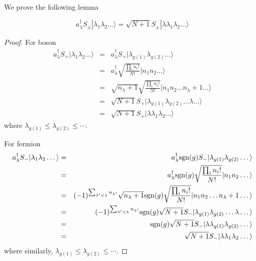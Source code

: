 \documentclass[12pt]{book}
\begin{document}
	We prove the following lemma
	\begin{lemma}\label{lem:aS}
		\begin{equation}
			a_\lambda^\dagger S_\pm|\lambda_1\lambda_2\dots\rangle=\sqrt{N+1}S_\pm|\lambda\lambda_1\lambda_2\dots\rangle
		\end{equation}
	\end{lemma}
	\begin{proof}
		For boson
		\begin{eqnarray}
			a_\lambda^\dagger S_+|\lambda_1\lambda_2\dots\rangle&=&a_\lambda^\dagger S_+|\lambda_{g(1)}\lambda_{g(2)}\dots\rangle\\
			&=&a_\lambda^\dagger\sqrt{\frac{\prod_i n_i!}{N!}}|n_1n_2\dots\rangle\\
			&=&\sqrt{n_\lambda+1}\sqrt{\frac{\prod_i n_i!}{N!}}|n_1n_2\dots n_\lambda+1\dots\rangle\\
			&=&\sqrt{N+1}S_+|\lambda_{g(1)}\lambda_{g(2)}\dots\lambda\dots\rangle\\
			&=&\sqrt{N+1}S_+|\lambda\lambda_1\lambda_2\dots\rangle
		\end{eqnarray}
		where $\lambda_{g(1)}\leq\lambda_{g(2)}\leq\cdots$.
		
		For fermion
		\begin{eqnarray}
			a_\lambda^\dagger S_-|\lambda_1\lambda_2\dots\rangle&=&a_\lambda^\dagger{\rm sgn}(g)S_-|\lambda_{g(1)}\lambda_{g(2)}\dots\rangle\\
			&=&a_\lambda^\dagger{\rm sgn}(g)\sqrt{\frac{\prod_i n_i!}{N!}}|n_1n_2\dots\rangle\\
			&=&(-1)^{\sum_{\lambda'<\lambda}n_{\lambda'}}\sqrt{n_\lambda+1}{\rm sgn}(g)\sqrt{\frac{\prod_i n_i!}{N!}}|n_1n_2\dots n_\lambda+1\dots\rangle\\
			&=&(-1)^{\sum_{\lambda'<\lambda}n_{\lambda'}}{\rm sgn}(g)\sqrt{N+1}S_-|\lambda_{g(1)}\lambda_{g(2)}\dots\lambda\dots\rangle\\
			&=&{\rm sgn}(g)\sqrt{N+1}S_-|\lambda\lambda_{g(1)}\lambda_{g(2)}\dots\rangle\\
			&=&\sqrt{N+1}S_-|\lambda\lambda_1\lambda_2\dots\rangle
		\end{eqnarray}
		where similarly, $\lambda_{g(1)}\leq\lambda_{g(2)}\leq\cdots$.
	\end{proof}
	
\end{document}
